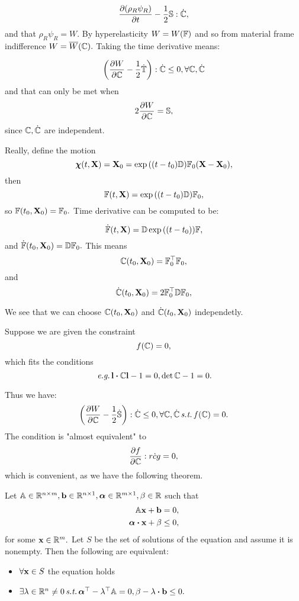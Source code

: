 \documentclass[reqno, a4paper]{article}
\begin{document}
\[
	\pdv{\qty(\rho_R \psi_R)}{t} - \frac{1}{2}\mathbb{S}:\dot{\mathbb{C}},
\]
and that $\rho_R \psi_R = W.$ By hyperelasticity $W = W\qty(\mathbb{F})$ and so from material frame indifference $W = \overline{W}\qty(\mathbb{C}).$ Taking the time derivative means:

\[
	\qty(\pdv{W}{\ensuremath{\mathbb{C}}}-\frac{1}{2}\dot{\mathbb{T}}):\dot{\mathbb{C}} \leq 0, \forall \mathbb{C}, \dot{\mathbb{C}}
\]
and that can only be met when
\[
	2 \pdv{W}{\ensuremath{\mathbb{C}}} = \mathbb{S},
\]
since $\mathbb{C}, \dot{\mathbb{C}}$ are independent.

Really, define the motion
\[
	\vb*{\chi}\qty(t,\vb{X}) = \vb{X}_0 = \exp\qty(\qty(t-t_0)\mathbb{D}) \mathbb{F}_0\qty(\vb{X}-\vb{X}_0),
\]
then
\[
	\mathbb{F}\qty(t,\vb{X}) = \exp\qty(\qty(t-t_0)\mathbb{D})\mathbb{F}_0,
\]
so $\mathbb{F}\qty(t_0, \vb{X}_0) = \mathbb{F}_0.$ Time derivative can be computed to be:

\[
	\dot{\mathbb{F}} \qty(t,\vb{X})= \mathbb{D} \exp\qty(\qty(t-t_0))\mathbb{F},
\]
and $\dot{\mathbb{F}}\qty(t_0, \vb{X}_0) = \mathbb{D}\mathbb{F}_0.$ This means
\[
	\mathbb{C}\qty(t_0, \vb{X}_0) = \mathbb{F}_0^\top\mathbb{F}_0,
\]
and
\[
	\dot{\mathbb{C}}\qty(t_0, \vb{X}_0) = 2 \mathbb{F}_0^\top \mathbb{D} \mathbb{F}_0,
\]

We see that we can choose $\mathbb{C}\qty(t_0, \vb{X}_0)$ and $\dot{\mathbb{C}}\qty(t_0, \vb{X}_0)$ independetly.

Suppose we are given the constraint
\[
	f\qty(\mathbb{C}) = 0,
\]
which fits the conditions
\[
	\, \text{\textit{e.g.}} \,\vb{l}\vdot \rcg \vb{l}-1 = 0, \det \rcg -1 =0.
\]

Thus we have:
\[
	\qty(\pdv{W}{\ensuremath{\mathbb{C}}}- \frac{1}{2}\dot{\mathbb{S}}): \dot{\mathbb{C}} \leq 0, \forall \mathbb{C}, \dot{\mathbb{C}} \, \text{\textit{s.t.}} \, f\qty(\mathbb{C})=0.
\]
The condition is "almost equivalent" to
\[
	\pdv{f}{\ensuremath{\mathbb{C}}}:\dot{rcg} = 0,
\]
which is convenient, as we have the following theorem.

\begin{theorem}
Let $\mathbb{A} \in {\mathbb R}^{n \times m}, \vb{b} \in {\mathbb R}^{n \times 1}, \vb*{\alpha}\in {\mathbb R}^{m \times 1}, \beta \in {\mathbb R}$ such that
\begin{align*}
	\tensorq{A}\vb{x}+\vb{b} &= 0, \\
	\vb*{\alpha}\vdot \vb{x} + \beta &\leq 0,
\end{align*}
for some $\vb{x} \in {\mathbb R}^{m}.$
    Let $S$ be the set of solutions of the equation and assume it is nonempty. Then the following are equivalent:
\begin{itemize}
	\item $\forall \vb{x} \in S$ the equation holds
	\item $\exists \lambda \in \R^n \neq 0 \, \text{\textit{s.t.}} \, \transpose{\vb*{\alpha}}- \transpose{\lambda}\tensorq{A} =0, \beta - \lambda \vdot \vb{b} \leq 0.$
\end{itemize}
\end{theorem}
\end{document}
